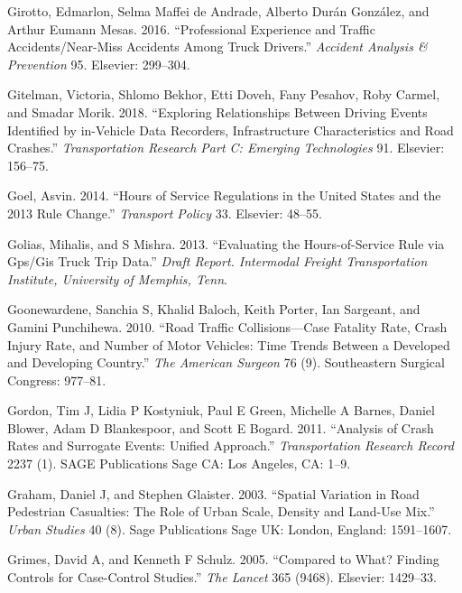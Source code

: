 \documentclass[12pt]{book}
\numberwithin{equation}{chapter}
\begin{document}
\leavevmode\hypertarget{ref-girotto2016professional}{}%
Girotto, Edmarlon, Selma Maffei de Andrade, Alberto Durán González, and Arthur Eumann Mesas. 2016. ``Professional Experience and Traffic Accidents/Near-Miss Accidents Among Truck Drivers.'' \emph{Accident Analysis \& Prevention} 95. Elsevier: 299--304.

\leavevmode\hypertarget{ref-gitelman2018exploring}{}%
Gitelman, Victoria, Shlomo Bekhor, Etti Doveh, Fany Pesahov, Roby Carmel, and Smadar Morik. 2018. ``Exploring Relationships Between Driving Events Identified by in-Vehicle Data Recorders, Infrastructure Characteristics and Road Crashes.'' \emph{Transportation Research Part C: Emerging Technologies} 91. Elsevier: 156--75.

\leavevmode\hypertarget{ref-goel2014hours}{}%
Goel, Asvin. 2014. ``Hours of Service Regulations in the United States and the 2013 Rule Change.'' \emph{Transport Policy} 33. Elsevier: 48--55.

\leavevmode\hypertarget{ref-golias2013evaluating}{}%
Golias, Mihalis, and S Mishra. 2013. ``Evaluating the Hours-of-Service Rule via Gps/Gis Truck Trip Data.'' \emph{Draft Report. Intermodal Freight Transportation Institute, University of Memphis, Tenn}.

\leavevmode\hypertarget{ref-goonewardene2010road}{}%
Goonewardene, Sanchia S, Khalid Baloch, Keith Porter, Ian Sargeant, and Gamini Punchihewa. 2010. ``Road Traffic Collisions---Case Fatality Rate, Crash Injury Rate, and Number of Motor Vehicles: Time Trends Between a Developed and Developing Country.'' \emph{The American Surgeon} 76 (9). Southeastern Surgical Congress: 977--81.

\leavevmode\hypertarget{ref-gordon2011analysis}{}%
Gordon, Tim J, Lidia P Kostyniuk, Paul E Green, Michelle A Barnes, Daniel Blower, Adam D Blankespoor, and Scott E Bogard. 2011. ``Analysis of Crash Rates and Surrogate Events: Unified Approach.'' \emph{Transportation Research Record} 2237 (1). SAGE Publications Sage CA: Los Angeles, CA: 1--9.

\leavevmode\hypertarget{ref-graham2003spatial}{}%
Graham, Daniel J, and Stephen Glaister. 2003. ``Spatial Variation in Road Pedestrian Casualties: The Role of Urban Scale, Density and Land-Use Mix.'' \emph{Urban Studies} 40 (8). Sage Publications Sage UK: London, England: 1591--1607.

\leavevmode\hypertarget{ref-grimes2005compared}{}%
Grimes, David A, and Kenneth F Schulz. 2005. ``Compared to What? Finding Controls for Case-Control Studies.'' \emph{The Lancet} 365 (9468). Elsevier: 1429--33.
\end{document}
